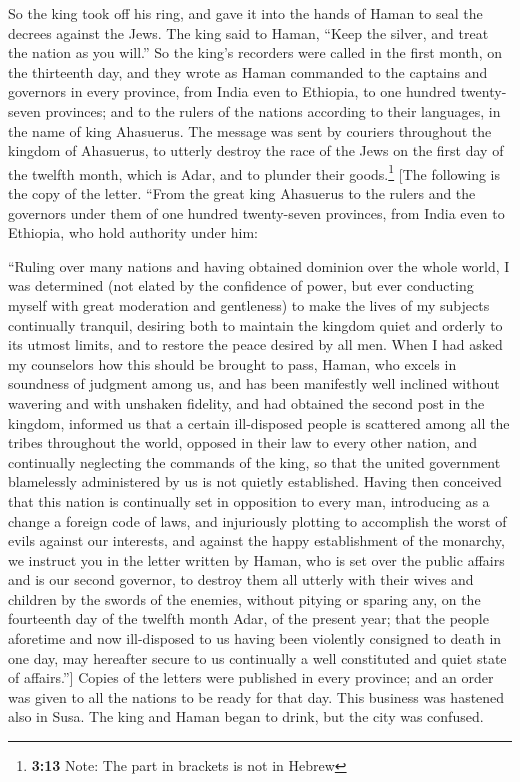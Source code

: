  So the king took off his ring, and gave it into the
hands of Haman to seal the decrees against the Jews.  The
king said to Haman, ``Keep the silver, and treat the nation as you
will.''  So the king's recorders were called in the first
month, on the thirteenth day, and they wrote as Haman commanded to the
captains and governors in every province, from India even to Ethiopia,
to one hundred twenty-seven provinces; and to the rulers of the nations
according to their languages, in the name of king Ahasuerus.
 The message was sent by couriers throughout the kingdom
of Ahasuerus, to utterly destroy the race of the Jews on the first day
of the twelfth month, which is Adar, and to plunder their
goods.\footnote{\textbf{3:13} Note: The part in brackets is not in
  Hebrew} {[}The following is the copy of the letter. ``From the great
king Ahasuerus to the rulers and the governors under them of one hundred
twenty-seven provinces, from India even to Ethiopia, who hold authority
under him:

``Ruling over many nations and having obtained dominion over the whole
world, I was determined (not elated by the confidence of power, but ever
conducting myself with great moderation and gentleness) to make the
lives of my subjects continually tranquil, desiring both to maintain the
kingdom quiet and orderly to its utmost limits, and to restore the peace
desired by all men. When I had asked my counselors how this should be
brought to pass, Haman, who excels in soundness of judgment among us,
and has been manifestly well inclined without wavering and with unshaken
fidelity, and had obtained the second post in the kingdom, informed us
that a certain ill-disposed people is scattered among all the tribes
throughout the world, opposed in their law to every other nation, and
continually neglecting the commands of the king, so that the united
government blamelessly administered by us is not quietly established.
Having then conceived that this nation is continually set in opposition
to every man, introducing as a change a foreign code of laws, and
injuriously plotting to accomplish the worst of evils against our
interests, and against the happy establishment of the monarchy, we
instruct you in the letter written by Haman, who is set over the public
affairs and is our second governor, to destroy them all utterly with
their wives and children by the swords of the enemies, without pitying
or sparing any, on the fourteenth day of the twelfth month Adar, of the
present year; that the people aforetime and now ill-disposed to us
having been violently consigned to death in one day, may hereafter
secure to us continually a well constituted and quiet state of
affairs.''{]}  Copies of the letters were published in
every province; and an order was given to all the nations to be ready
for that day.  This business was hastened also in Susa.
The king and Haman began to drink, but the city was confused.

